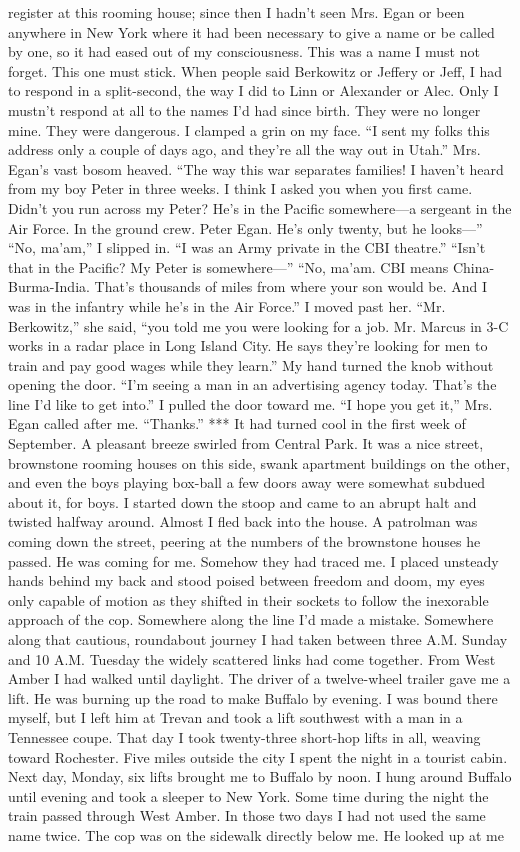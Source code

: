 \documentclass{novel}
\begin{document}
register at this rooming house; since then I hadn’t seen Mrs. Egan or been anywhere in New York where it had been necessary to give a name or be called by one, so it had eased out of my consciousness. This was a name I must not forget. This one must stick. When people said Berkowitz or Jeffery or Jeff, I had to respond in a split-second, the way I did to Linn or Alexander or Alec. Only I mustn’t respond at all to the names I’d had since birth. They were no longer mine. They were dangerous. I clamped a grin on my face. “I sent my folks this address only a couple of days ago, and they’re all the way out in Utah.” Mrs. Egan’s vast bosom heaved. “The way this war separates families! I haven’t heard from my boy Peter in three weeks. I think I asked you when you first came. Didn’t you run across my Peter? He’s in the Pacific somewhere—a sergeant in the Air Force. In the ground crew. Peter Egan. He’s only twenty, but he looks—” “No, ma’am,” I slipped in. “I was an Army private in the CBI theatre.” “Isn’t that in the Pacific? My Peter is somewhere—” “No, ma’am. CBI means China-Burma-India. That’s thousands of miles from where your son would be. And I was in the infantry while he’s in the Air Force.” I moved past her. “Mr. Berkowitz,” she said, “you told me you were looking for a job. Mr. Marcus in 3-C works in a radar place in Long Island City. He says they’re looking for men to train and pay good wages while they learn.” My hand turned the knob without opening the door. “I’m seeing a man in an advertising agency today. That’s the line I’d like to get into.” I pulled the door toward me. “I hope you get it,” Mrs. Egan called after me. “Thanks.” *** It had turned cool in the first week of September. A pleasant breeze swirled from Central Park. It was a nice street, brownstone rooming houses on this side, swank apartment buildings on the other, and even the boys playing box-ball a few doors away were somewhat subdued about it, for boys. I started down the stoop and came to an abrupt halt and twisted halfway around. Almost I fled back into the house. A patrolman was coming down the street, peering at the numbers of the brownstone houses he passed. He was coming for me. Somehow they had traced me. I placed unsteady hands behind my back and stood poised between freedom and doom, my eyes only capable of motion as they shifted in their sockets to follow the inexorable approach of the cop. Somewhere along the line I’d made a mistake. Somewhere along that cautious, roundabout journey I had taken between three A.M. Sunday and 10 A.M. Tuesday the widely scattered links had come together. From West Amber I had walked until daylight. The driver of a twelve-wheel trailer gave me a lift. He was burning up the road to make Buffalo by evening. I was bound there myself, but I left him at Trevan and took a lift southwest with a man in a Tennessee coupe. That day I took twenty-three short-hop lifts in all, weaving toward Rochester. Five miles outside the city I spent the night in a tourist cabin. Next day, Monday, six lifts brought me to Buffalo by noon. I hung around Buffalo until evening and took a sleeper to New York. Some time during the night the train passed through West Amber. In those two days I had not used the same name twice. The cop was on the sidewalk directly below me. He looked up at me 
\end{document}
